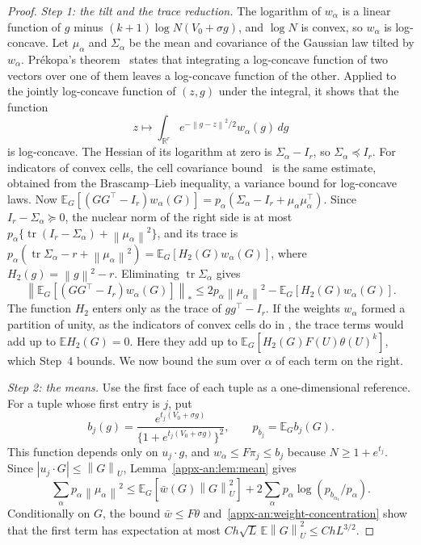 \documentclass[11pt,letterpaper]{article}
\newif\ifshowrev
\newcommand{\rev}[1]{\ifshowrev{\color{revblue}%
\hypersetup{linkcolor=revblue,citecolor=revblue,urlcolor=revblue}#1}\else#1\fi}
\newenvironment{revblock}{\ifshowrev\color{revblue}%
\hypersetup{linkcolor=revblue,citecolor=revblue,urlcolor=revblue}\fi}{}
\newif\ifshowpass
\newcommand{\pass}[1]{\ifshowpass{\color{revblue}%
\hypersetup{linkcolor=revblue,citecolor=revblue,urlcolor=revblue}#1}\else#1\fi}
\newcommand{\ps}[1]{\ifshowpass{\color{revblue}#1}\else#1\fi}
\newif\ifshowtrim
\newcommand{\trim}[1]{\ifshowtrim{\color{revblue}%
\hypersetup{linkcolor=revblue,citecolor=revblue,urlcolor=revblue}#1}\else#1\fi}
\newif\ifshowskill
\newcommand{\skl}[1]{\ifshowskill{\color{revblue}%
\hypersetup{linkcolor=revblue,citecolor=revblue,urlcolor=revblue}#1}\else#1\fi}
\newcommand{\sks}[1]{\ifshowskill{\color{revblue}#1}\else#1\fi}
\newif\ifshownat
\newcommand{\nat}[1]{\ifshownat{\color{revblue}%
\hypersetup{linkcolor=revblue,citecolor=revblue,urlcolor=revblue}#1}\else#1\fi}
\theoremstyle{remark}
\newcommand{\E}{\mathbb E}
\newcommand{\R}{\mathbb R}
\newcommand{\tr}{\operatorname{tr}}
\newcommand{\norm}[1]{\left\lVert#1\right\rVert}
\newcommand{\dd}{\,d}
\begin{document}
\begin{revblock}
\begin{proof}
\emph{Step 1: the tilt and the trace reduction.} The logarithm of
\(w_\alpha\) is a linear function of \(g\) minus
\((k+1)\log N(V_0+\sigma g)\), and \(\log N\) is convex, so \(w_\alpha\)
is log-concave. Let \(\mu_\alpha\) and \(\sks{\Sigma_\alpha}\) be the mean and
covariance of the Gaussian law tilted by \(w_\alpha\). Pr\'ekopa's
theorem~\cite[Theorem~6]{Prekopa1973} states that integrating a
log-concave function of two vectors over one of them leaves a
log-concave function of the other. Applied to the jointly log-concave
function of \((z,g)\) under the integral, it shows that the function
\[
 z\longmapsto\int_{\R^r}e^{-\norm{g-z}^2/2}w_\alpha(g)\dd g
\]
is log-concave. The Hessian of its logarithm at zero is
\(\sks{\Sigma_\alpha}-I_r\), so \(\sks{\Sigma_\alpha}\preceq I_r\). \rev{For indicators of
convex cells, \nat{the cell covariance bound~\cite[Lemma~11]{GaoZhang} is the same estimate, obtained} from the Brascamp--Lieb inequality\pass{, a variance bound for log-concave
laws}.} Now
\(\E_G[(GG^\top-I_r)w_\alpha(G)]=p_\alpha(\sks{\Sigma_\alpha}-I_r+\mu_\alpha\mu_\alpha^\top)\).
Since \(I_r-\sks{\Sigma_\alpha}\succeq0\), the nuclear norm of the right side is at
most \(p_\alpha\{\tr(I_r-\sks{\Sigma_\alpha})+\norm{\mu_\alpha}^2\}\), and its trace is
\(p_\alpha(\tr \sks{\Sigma_\alpha}-r+\norm{\mu_\alpha}^2)=\E_G[H_2(G)w_\alpha(G)]\),
where \(H_2(g)=\norm g^2-r\). Eliminating \(\tr \sks{\Sigma_\alpha}\) gives
\begin{equation}
 \left\|\E_G[(GG^\top-I_r)w_\alpha(G)]\right\|_*
 \le2p_\alpha\norm{\mu_\alpha}^2
             -\E_G[H_2(G)w_\alpha(G)].
 \label{appx-an:matrix-trace-reduction}
\end{equation}
\trim{The function \(H_2\) enters only as the trace of
\(gg^\top-I_r\). If the weights \(w_\alpha\) formed a partition of
unity, as the indicators of convex cells do in \nat{\cite[Lemma~12]{GaoZhang}}, the trace terms would add up to \(\E H_2(G)=0\). Here they add
up to \(\E_G[H_2(G)F(U)\theta(U)^k]\), which Step~4 bounds.}
\skl{We now} bound the sum over \(\alpha\) of each term on the right.

\emph{Step 2: the means.} Use the first face of each tuple as a
one-dimensional reference. For a tuple whose first entry is \(j\), put
\[
 b_j(g)=\frac{e^{t_j(V_0+\sigma g)}}
                   {\{1+e^{t_j(V_0+\sigma g)}\}^2},
 \qquad p_{b_j}=\E_Gb_j(G).
\]
This function depends only on \(u_j\cdot g\), and
\(w_\alpha\le F\pi_j\le b_j\) because \(N\ge1+e^{t_j}\). Since
\(|u_j\cdot G|\le\norm G_U\), Lemma~\ref{appx-an:lem:mean} gives
\begin{equation}
 \sum_\alpha p_\alpha\norm{\mu_\alpha}^2
 \le\E_G[\ps{\bar w}(G)\norm G_U^2]
       +2\sum_\alpha p_\alpha\log(p_{b_{\alpha_1}}/p_\alpha).
 \label{appx-an:entropy-sum}
\end{equation}
Conditionally on \(G\), the bound \(\ps{\bar w}\le F\theta\)
and~\eqref{appx-an:weight-concentration} show that the first term has
expectation at most \(Ch\sqrt L\,\E\norm G_U^2\le ChL^{3/2}\).


\end{proof}
\end{revblock}
\end{document}
